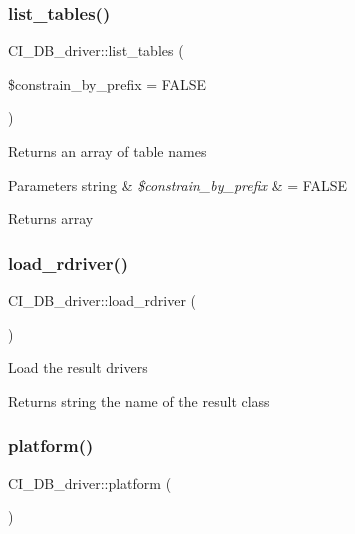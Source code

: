\subsubsection{\texorpdfstring{list\+\_\+tables()}{list\_tables()}}
{\footnotesize\ttfamily C\+I\+\_\+\+D\+B\+\_\+driver\+::list\+\_\+tables (\begin{DoxyParamCaption}\item[{}]{\$constrain\+\_\+by\+\_\+prefix = {\ttfamily FALSE} }\end{DoxyParamCaption})}

Returns an array of table names


\begin{DoxyParams}[1]{Parameters}
string & {\em \$constrain\+\_\+by\+\_\+prefix} & = F\+A\+L\+SE \\
\hline
\end{DoxyParams}
\begin{DoxyReturn}{Returns}
array 
\end{DoxyReturn}
\mbox{\label{class_c_i___d_b__driver_a1f43155b04b80773640ffb60dd6e0258}} 
\subsubsection{\texorpdfstring{load\+\_\+rdriver()}{load\_rdriver()}}
{\footnotesize\ttfamily C\+I\+\_\+\+D\+B\+\_\+driver\+::load\+\_\+rdriver (\begin{DoxyParamCaption}{ }\end{DoxyParamCaption})}

Load the result drivers

\begin{DoxyReturn}{Returns}
string the name of the result class 
\end{DoxyReturn}
\mbox{\label{class_c_i___d_b__driver_a69dc8f4ac40d5bb9f32923b5669196cf}} 
\subsubsection{\texorpdfstring{platform()}{platform()}}
{\footnotesize\ttfamily C\+I\+\_\+\+D\+B\+\_\+driver\+::platform (\begin{DoxyParamCaption}{ }\end{DoxyParamCaption})}

